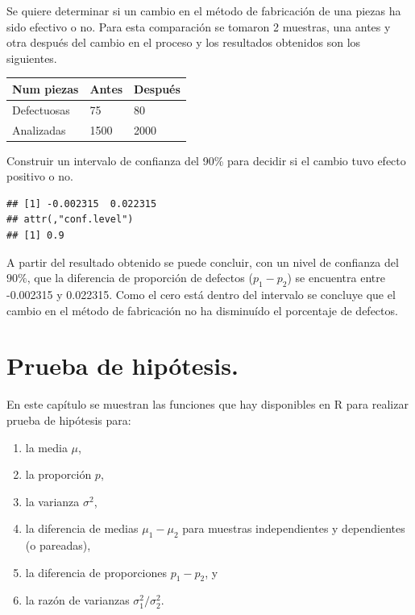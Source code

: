 \documentclass[10pt,]{krantz}
\makeatletter
\newenvironment{Shaded}{\begin{snugshade}}{\end{snugshade}}
\newcommand{\KeywordTok}[1]{\textcolor[rgb]{0.13,0.29,0.53}{\textbf{{#1}}}}
\newcommand{\DataTypeTok}[1]{\textcolor[rgb]{0.13,0.29,0.53}{{#1}}}
\newcommand{\DecValTok}[1]{\textcolor[rgb]{0.00,0.00,0.81}{{#1}}}
\newcommand{\FloatTok}[1]{\textcolor[rgb]{0.00,0.00,0.81}{{#1}}}
\newcommand{\NormalTok}[1]{{#1}}
\providecommand{\tightlist}{%
  \setlength{\itemsep}{0pt}\setlength{\parskip}{0pt}}
\let\proglang=\textsf
\newenvironment{kframe}{%
\medskip{}
\setlength{\fboxsep}{.8em}
 \def\at@end@of@kframe{}%
 \ifinner\ifhmode%
  \def\at@end@of@kframe{\end{minipage}}%
  \begin{minipage}{\columnwidth}%
 \fi\fi%
 \def\FrameCommand##1{\hskip\@totalleftmargin \hskip-\fboxsep
 \colorbox{shadecolor}{##1}\hskip-\fboxsep
     \hskip-\linewidth \hskip-\@totalleftmargin \hskip\columnwidth}%
 \MakeFramed {\advance\hsize-\width
   \@totalleftmargin\z@ \linewidth\hsize
   \@setminipage}}%
 {\par\unskip\endMakeFramed%
 \at@end@of@kframe}
\renewenvironment{Shaded}{\begin{kframe}}{\end{kframe}}
\makeatother
\begin{document}
Se quiere determinar si un cambio en el método de fabricación de una
piezas ha sido efectivo o no. Para esta comparación se tomaron 2
muestras, una antes y otra después del cambio en el proceso y los
resultados obtenidos son los siguientes.

\begin{longtable}[]{@{}lll@{}}
\toprule
Num piezas & Antes & Después\tabularnewline
\midrule
\endhead
Defectuosas & 75 & 80\tabularnewline
Analizadas & 1500 & 2000\tabularnewline
\bottomrule
\end{longtable}

Construir un intervalo de confianza del 90\% para decidir si el cambio
tuvo efecto positivo o no.

\begin{Shaded}
\end{Shaded}

\begin{verbatim}
## [1] -0.002315  0.022315
## attr(,"conf.level")
## [1] 0.9
\end{verbatim}

A partir del resultado obtenido se puede concluir, con un nivel de
confianza del \(90\%\), que la diferencia de proporción de defectos
(\(p_1 - p_2\)) se encuentra entre -0.002315 y 0.022315. Como el cero
está dentro del intervalo se concluye que el cambio en el método de
fabricación no ha disminuído el porcentaje de defectos.

\chapter{Prueba de hipótesis.}\label{prueba-de-hipotesis.}

En este capítulo se muestran las funciones que hay disponibles en
\proglang{R} para realizar prueba de hipótesis para:

\begin{enumerate}
\def\labelenumi{\arabic{enumi}.}
\tightlist
\item
  la media \(\mu\),
\item
  la proporción \(p\),
\item
  la varianza \(\sigma^2\),
\item
  la diferencia de medias \(\mu_1-\mu_2\) para muestras independientes y
  dependientes (o pareadas),
\item
  la diferencia de proporciones \(p_1 - p_2\), y
\item
  la razón de varianzas \(\sigma_1^2 / \sigma_2^2\).
\end{enumerate}
\end{document}
